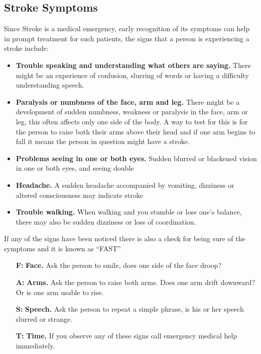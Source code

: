 \subsection{Stroke Symptoms}
Since Stroke is a medical emergency, early recognition of its symptoms can help in prompt treatment for such patients, \cite{mayosym} the signs that a person is experiencing a stroke include:
\begin{itemize}%
	\item \textbf{Trouble speaking and understanding what others are saying.} 	 There might be an experience of confusion, slurring of words or having a difficulty understanding speech.
	\item \textbf{Paralysis or numbness of the face, arm and leg.} There might be a development of sudden numbness, weakness or paralysis in the face, arm or leg, this often affects only one side of the body. A way to test for this is for the person to raise both their arms above their head and if one arm begins to fall it means the person in question might have a stroke.
	\item \textbf{Problems seeing in one or both eyes.} Sudden blurred or blackened vision in one or both eyes, and seeing double
	\item \textbf{Headache.} A sudden headache accompanied by vomiting, dizziness or altered consciousness may indicate stroke
	\item \textbf{Trouble walking.}  When walking and you stumble or lose one’s balance, there may also be sudden dizziness or loss of coordination.
\end{itemize}

If any of the signs have been noticed there is also a check for being sure of the symptoms and it is known as “FAST”\\
\begin{itemize}%
	\item[\textbf{F:}]\textbf{ Face.} Ask the person to smile, does one side of the face droop?
	\item[\textbf{A:}]\textbf{ Arms.} Ask the person to raise both arms. Does one arm drift downward? Or is one arm usable to rise.
	\item[\textbf{S:}]\textbf{ Speech.} Ask the person to repeat a simple phrase, is his or her speech slurred or strange.
	\item[\textbf{T:}]\textbf{ Time.} If you observe any of these signs call emergency medical help immediately.
\end{itemize}


